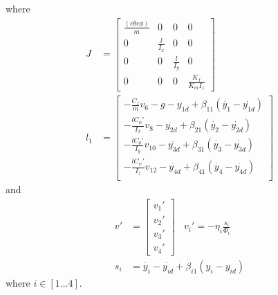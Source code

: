 \documentclass[conference]{IEEEtran}
\newcommand{\cphi}{c\phi}
\newcommand{\cth}{c\theta}
\begin{document}
where
\begin{align*}
J &= \begin{bmatrix}
 \frac{(\cth\cphi) }{m} & 0 & 0 & 0\\ 
 0 & \frac{l}{I_x} & 0 & 0\\ 
 0 & 0 & \frac{l}{I_y}  & 0 \\ 
 0 & 0 & 0 & \frac{K_f}{K_mI_z} 
\end{bmatrix} \\
l_1 &= \begin{bmatrix}
-\frac{C_z}{m}v_6 - g - \ddot{y_{1d}} + \beta_{11}(\dot{y_1} - \dot{y_{1d}})\\
-\frac{lC_\phi'}{I_x}v_8 - \ddot{y_{2d}} + \beta_{21}(\dot{y_2} - \dot{y_{2d}})  \\
-\frac{lC_\theta'}{I_y}v_{10} - \ddot{y_{3d}} + \beta_{31}(\dot{y_3} - \dot{y_{3d}})   \\
-\frac{lC_\psi'}{I_z}v_{12} - \ddot{y_{4d}} + \beta_{41}(\dot{y_4} - \dot{y_{4d}})   \\
\end{bmatrix}
\end{align*}
and
\begin{align*}
v' &= \begin{bmatrix}
v_1' \\
v_2' \\
v_3' \\
v_4'
\end{bmatrix} \ \ \ \
v_i' = -\eta_i\frac{s_i}{\Phi_i} \\
s_i &=  \dot{y_{i}} - \dot{y_{id}} + \beta_{i1}(y_i - y_{id})
\end{align*}
where $i \in [1 \dots 4]$.
\end{document}
